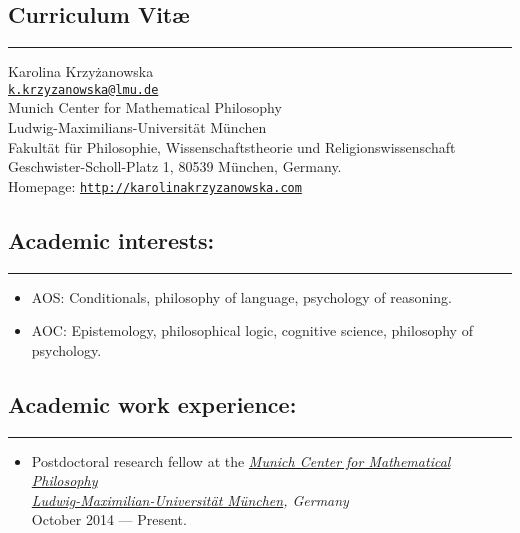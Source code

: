\documentclass[a4paper,12pt]{article}
\begin{document}
\newcommand{\headone}[1] {
 \section*{#1}
\rule[2.5ex]{\textwidth}{2pt}}

\newcommand{\headtwo}[1]{
  \subsection*{#1}
  \rule[1.5ex]{\textwidth}{.5pt}}

\newcommand{\headthree}[1]{ {\large #1}}

\newcommand{\link}[1]{ \texttt{\href{#1}{#1}}}

\begin{small}

  \headone{Curriculum Vit\ae}
  
  Karolina Krzyżanowska\\
  \href{mailto:k.krzyzanowska@lmu.de}{\texttt{k.krzyzanowska@lmu.de}}\\
  Munich Center for Mathematical Philosophy\\
  Ludwig-Maximilians-Universität München\\
  Fakultät für Philosophie, Wissenschaftstheorie und Religionswissenschaft\\
  Geschwister-Scholl-Platz 1, 80539 München, Germany.\\
  Homepage: \href{http://karolinakrzyzanowska.com}{\texttt{http://karolinakrzyzanowska.com}}\\


  
  \headtwo{Academic interests:}
  \begin{itemize}
  \item AOS: Conditionals, philosophy of language, psychology of reasoning.
  \item AOC: Epistemology, philosophical logic, cognitive science,
    philosophy of psychology.
  \end{itemize}
  
  \headtwo{Academic work experience:}
  \begin{itemize}
    \item Postdoctoral research fellow at the \emph{\href{http://www.mcmp.philosophie.uni-muenchen.de/}{Munich Center for Mathematical Philosophy}}\\
    \emph{\href{http://www.en.uni-muenchen.de/}{Ludwig-Maximilian-Universität München}, Germany}\\
    October 2014 --- Present.


\end{itemize}
\end{small}
\end{document}
